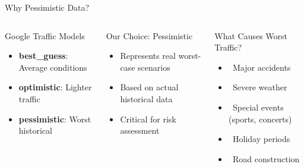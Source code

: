 \documentclass[aspectratio=169,9pt]{beamer}
\begin{document}
\begin{frame}{Why Pessimistic Data?}
\begin{columns}
\begin{block}{Google Traffic Models}
\begin{itemize}
    \item \textbf{best\_guess}: Average conditions
    \item \textbf{optimistic}: Lighter traffic
    \item \textcolor{revoRed}{\textbf{pessimistic}}: Worst historical
\end{itemize}
\end{block}

\begin{alertblock}{Our Choice: Pessimistic}
\begin{itemize}
    \item Represents real worst-case scenarios
    \item Based on actual historical data
    \item Critical for risk assessment
\end{itemize}
\end{alertblock}

\begin{exampleblock}{What Causes Worst Traffic?}
\begin{itemize}
    \item \faExclamationTriangle\ Major accidents
    \item \faCloudRain\ Severe weather
    \item \faFootballBall\ Special events (sports, concerts)
    \item \faCalendarAlt\ Holiday periods
    \item \faRoad\ Road construction
\end{itemize}
\end{exampleblock}
\end{columns}

\vspace{0.5em}
\begin{center}
\end{center}
\end{frame}
\end{document}
